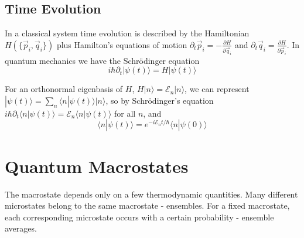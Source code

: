 \documentclass[12pt, a4paper, oneside, openright, titlepage]{book}
\begin{document}
\section{Time Evolution}

In a classical system time evolution is described by the Hamiltonian $H(\{\vec{p}_i,\vec{q}_i\})$ plus Hamilton's equations of motion $\partial_t\vec{p}_i = -\frac{\partial H}{\partial \vec{q}_i}$ and $\partial_t\vec{q}_i = \frac{\partial H}{\partial \vec{p}_i}$. In quantum mechanics we have the Schr\"{o}dinger equation \begin{equation*}
    i\hbar\partial_t|\psi(t)\rangle = H|\psi(t)\rangle
\end{equation*}

For an orthonormal eigenbasis of $H$, $H|n\rangle = \mathcal{E}_n|n\rangle$, we can represent $|\psi(t)\rangle = \sum_n\langle n|\psi(t)\rangle |n\rangle$, so by Schr\"{o}dinger's equation $i\hbar\partial_t\langle n|\psi(t)\rangle = \mathcal{E}_n\langle n|\psi(t)\rangle$ for all $n$, and \begin{equation*}
    \langle n|\psi(t)\rangle = e^{-i\mathcal{E}_nt/\hbar}\langle n|\psi(0)\rangle
\end{equation*}


\chapter{Quantum Macrostates}

\begin{rmk}
    The macrostate depends only on a few thermodynamic quantities. Many different microstates belong to the same macrostate - ensembles. For a fixed macrostate, each corresponding microstate occurs with a certain probability - ensemble averages.
\end{rmk}
\end{document}
